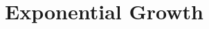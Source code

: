 \documentclass[color=usenames,dvipsnames]{beamer}\usepackage[]{graphicx}\usepackage[]{color}
\begin{document}

\section{Exponential Growth}
\end{document}
